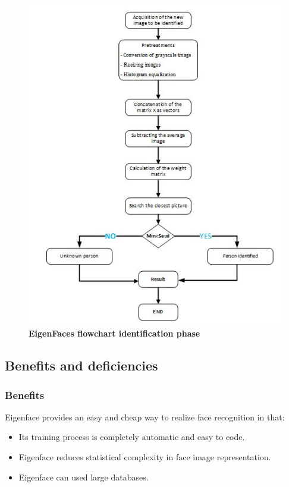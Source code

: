 \begin{figure}[bth]%
\begin{center}
\includegraphics[scale=0.85]{ef_idphase}%
\caption{\textbf{EigenFaces flowchart identification phase}}%
\label{ef_idphase}%
\end {center}
\end{figure}	
 \newpage
\subsection{Benefits and deficiencies}	
\subsubsection{Benefits}	
Eigenface provides an easy and cheap way to realize face recognition in that:
\begin{itemize}
\item Its training process is completely automatic and easy to code. 
\item Eigenface reduces statistical complexity in face image representation.
\item Eigenface can used large databases.
\end{itemize}


